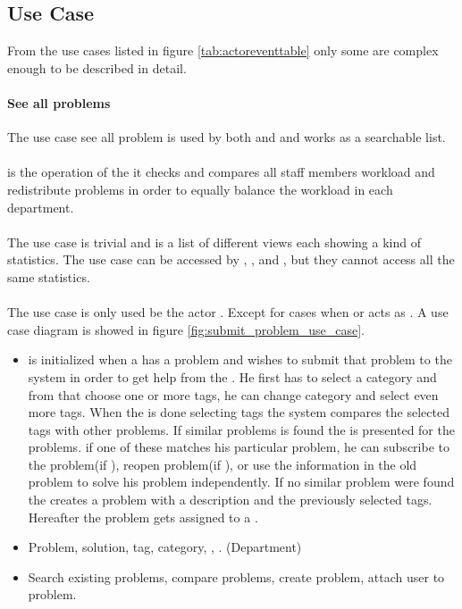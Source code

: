 \subsection{Use Case}
\label{sec:usecase}

From the use cases listed in figure \ref{tab:actoreventtable} only some are complex enough to be described in detail.  

\paragraph{See all problems} The use case see all problem is used by both \aclient{} and \astaff{} and works as a searchable list. 

\paragraph{\bloadwork[c]} \bloadwork[c] is the operation of the \wmon{} it checks and compares all staff members workload and redistribute problems in order to equally balance the workload in each department. 

\paragraph{\gstat[c]} The use case \gstat[] is trivial and is a list of different views each showing a kind of statistics. The use case can be accessed by \sadmin{}, \aclient{}, and \astaff{}, but they cannot access all the same statistics.

\paragraph{\ucsproblem[c]} The use case \ucsproblem[] is only used be the actor \aclient. Except for cases when \astaff{} or \sadmin{}  acts as \aclient{}. A use case diagram is showed in figure \ref{fig:submit_problem_use_case}. 
\begin{itemize}
\item {} \ucsproblem[c] is initialized when a \aclient{} has a problem and wishes to submit that problem to the system in order to get help from the \astaff{}. 
He first has to select a category and from that choose one or more tags, he can change category and select even more tags. 
When the \aclient{} is done selecting tags the system compares the selected tags with other problems. 
If similar problems is found the \aclient{} is presented for the problems.
if one of these matches his particular problem, he can subscribe to the problem(if \open), reopen problem(if \closed{}), or use the information in the old problem to solve his problem independently. 
If no similar problem were found the \aclient{} creates a problem with a description and the previously selected tags. 
Hereafter the problem gets assigned to a \astaff{}. 

\item {} Problem, solution, tag, category, \client, \staff. (Department)

\item {} Search existing problems, compare problems, create problem, attach user to problem.
\end{itemize}


